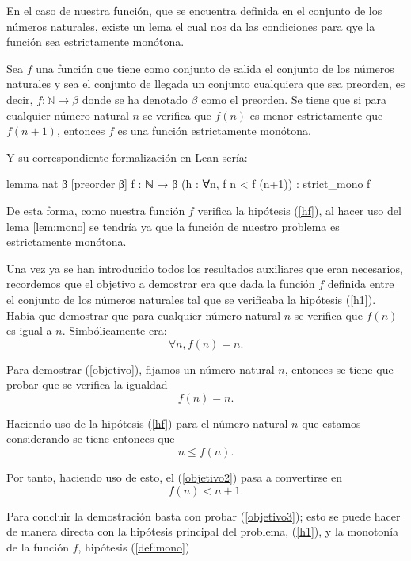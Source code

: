 \begin{demostracion}
  En el caso de nuestra función, que se encuentra definida en el conjunto
  de los números naturales, existe un lema el cual nos da las condiciones
  para qye la función sea estrictamente monótona.

  \begin{lema}\label{lem:mono}
    Sea \(f\) una función que tiene como conjunto de salida el conjunto
    de los números naturales y sea el conjunto de llegada un conjunto
    cualquiera que sea preorden, es decir, \(f:ℕ → β\) donde se ha
    denotado \(β\) como el preorden. Se tiene que si para cualquier
    número natural \(n\) se verifica que \(f(n)\) es menor estrictamente
    que \(f(n+1)\), entonces \(f\) es una función estrictamente monótona.
  \end{lema}

  Y su correspondiente formalización en Lean sería:
  \begin{leancode}
    lemma nat {β} [preorder β] {f : ℕ → β} (h : ∀n, f n < f (n+1)) :
    strict_mono f
  \end{leancode}

  De esta forma, como nuestra función \(f\) verifica la hipótesis
  (\ref{hf}), al hacer uso del lema \ref{lem:mono} se tendría ya que la
  función de nuestro problema es estrictamente monótona.

  Una vez ya se han introducido todos los resultados auxiliares que eran
  necesarios, recordemos que el objetivo a demostrar era que dada la
  función \(f\) definida entre el conjunto de los números naturales tal
  que se verificaba la hipótesis (\ref{h1}). Había que demostrar que
  para cualquier número natural \(n\) se verifica que \(f(n)\) es igual
  a \(n\). Simbólicamente era:
  \begin{equation}\label{objetivo}
    ∀n, f(n)=n.
  \end{equation}

  Para demostrar (\ref{objetivo}), fijamos un número natural \(n\),
  entonces se tiene que probar que se verifica la igualdad
  \begin{equation}\label{objetivo2}
    f(n)=n.
  \end{equation}

  Haciendo uso de la hipótesis (\ref{hf}) para el número natural \(n\) que
  estamos considerando se tiene entonces que
  \begin{equation}
    n≤f(n).
  \end{equation}

  Por tanto, haciendo uso de esto, el (\ref{objetivo2}) pasa a convertirse
  en
  \begin{equation}\label{objetivo3}
    f(n)<n+1.
  \end{equation}

  Para concluir la demostración basta con probar (\ref{objetivo3}); esto se
  puede hacer de manera directa con la hipótesis principal del problema,
  (\ref{h1}), y la monotonía de la función \(f\), hipótesis (\ref{def:mono})
\end{demostracion}

